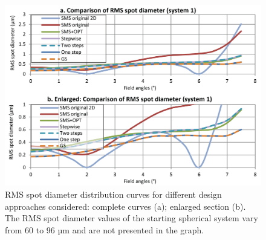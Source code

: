 \begin{figure}[h!]
    \centering
    \includegraphics[width=1\textwidth]{chapter-5/figures/Figure6_case1_rmsCurve.png}
    \caption{RMS spot diameter distribution curves for different design approaches considered: complete curves (a); enlarged section (b). The RMS spot diameter values of the starting spherical system vary from 60 to 96 µm and are not presented in the graph.}
    \label{fig: fig6_case1_RMScompare}
\end{figure}


